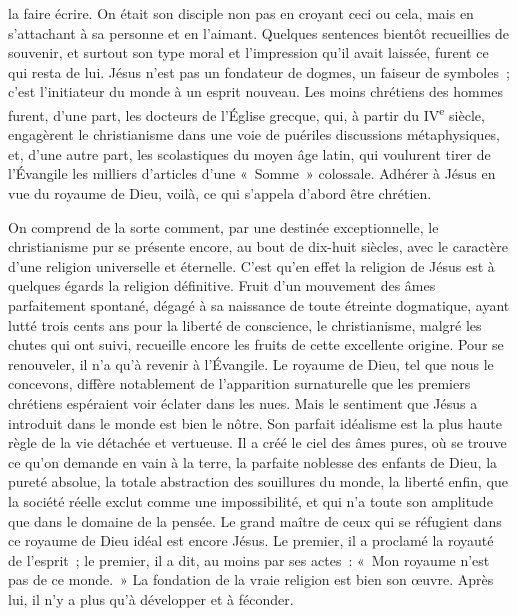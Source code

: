 \documentclass[french,twoside]{book} %
\begin{document}
la faire écrire. On était son disciple non pas en croyant ceci ou cela, mais en s’attachant à sa personne et en l’aimant. Quelques sentences bientôt recueillies de souvenir, et surtout son type moral et l’impression qu’il avait laissée, furent ce qui resta de lui. Jésus n’est pas un fondateur de dogmes, un faiseur de symboles ; c’est l’initiateur du monde à un esprit nouveau. Les moins chrétiens des hommes furent, d’une part, les docteurs de l’Église grecque, qui, à partir du IV\textsuperscript{e} siècle, engagèrent le christianisme dans une voie de puériles discussions métaphysiques, et, d’une autre part, les scolastiques du moyen âge latin, qui voulurent tirer de l’Évangile les milliers d’articles d’une « Somme » colossale. Adhérer à Jésus en vue du royaume de Dieu, voilà, ce qui s’appela d’abord être chrétien.\par
On comprend de la sorte comment, par une destinée exceptionnelle, le christianisme pur se présente encore, au bout de dix-huit siècles, avec le caractère d’une religion universelle et éternelle. C’est qu’en effet la religion de Jésus est à quelques égards la religion définitive. Fruit d’un mouvement des âmes parfaitement spontané, dégagé à sa naissance de toute étreinte dogmatique, ayant lutté trois cents ans pour la liberté de conscience, le christianisme, malgré les chutes qui ont suivi, recueille encore les fruits de cette excellente origine. Pour se renouveler, il n’a qu’à revenir à l’Évangile. Le royaume de Dieu, tel que nous le concevons, diffère notablement de l’apparition surnaturelle que les premiers chrétiens espéraient voir éclater dans les nues. Mais le sentiment que Jésus a introduit dans le monde est bien le nôtre. Son parfait idéalisme est la plus haute règle de la vie détachée et vertueuse. Il a créé le ciel des âmes pures, où se trouve ce qu’on demande en vain à la terre, la parfaite noblesse des enfants de Dieu, la pureté absolue, la totale abstraction des souillures du monde, la liberté enfin, que la société réelle exclut comme une impossibilité, et qui n’a toute son amplitude que dans le domaine de la pensée. Le grand maître de ceux qui se réfugient dans ce royaume de Dieu idéal est encore Jésus. Le premier, il a proclamé la royauté de l’esprit ; le premier, il a dit, au moins par ses actes : « Mon royaume n’est pas de ce monde. » La fondation de la vraie religion est bien son œuvre. Après lui, il n’y a plus qu’à développer et à féconder.\par
\end{document}
